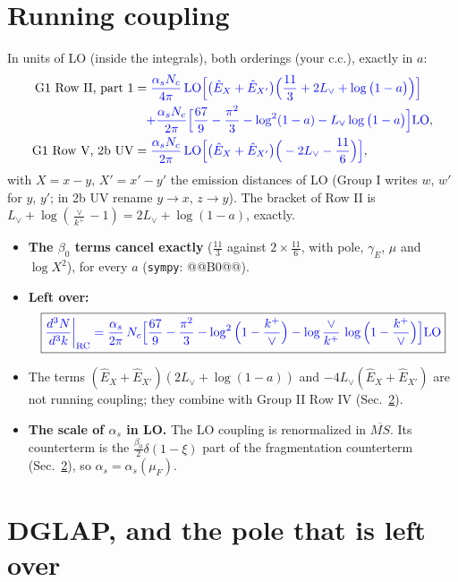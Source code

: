 \documentclass[10pt]{article}
\numberwithin{equation}{section}
\newcommand{\new}[1]{{\color{blue}#1}}
\newcommand{\Lv}{L_{\vee}}
\newcommand{\Eh}{\hat E}
\newcommand{\la}{\log\big(1-a\big)}
\begin{document}
\section{Running coupling}\label{sec:rc}
In units of LO (inside the integrals), both orderings (your c.c.), exactly in $a$:
\begin{align}
\text{G1 Row II, part 1}&=\new{\frac{\alpha_sN_c}{4\pi}\,{\rm LO}\Big[\big(\Eh_X+\Eh_{X'}\big)\Big(\frac{11}{3}+2\Lv+\la\Big)\Big]}\notag\\
&\quad\new{+\frac{\alpha_sN_c}{2\pi}\Big[\frac{67}{9}-\frac{\pi^2}{3}-\log^2(1-a)-\Lv\la\Big]{\rm LO}},\label{eq:rcII}\\
\text{G1 Row V, 2b UV}&=\new{\frac{\alpha_sN_c}{2\pi}\,{\rm LO}\Big[\big(\Eh_X+\Eh_{X'}\big)\Big(-2\Lv-\frac{11}{6}\Big)\Big]},\label{eq:rcV}
\end{align}
with $X=x-y$, $X'=x'-y'$ the emission distances of LO (Group I writes $w$, $w'$ for $y$, $y'$; in 2b UV rename $y\to x$, $z\to y$). The bracket of Row II is $\Lv+\log(\frac{\vee}{k^+}-1)=2\Lv+\log(1-a)$, exactly.
\begin{itemize}
\item \textbf{The $\beta_0$ terms cancel exactly} ($\frac{11}{3}$ against $2\times\frac{11}{6}$, with pole, $\gamma_E$, $\mu$ and $\log X^2$), for every $a$ (\texttt{sympy}: @@B0@@).
\item \textbf{Left over:}
\begin{equation}
\boxed{\new{\frac{d^3N}{d^3k}\bigg|_{\rm RC}=\frac{\alpha_s}{2\pi}\,N_c\Big[\frac{67}{9}-\frac{\pi^2}{3}-\log^2\Big(1-\frac{k^+}{\vee}\Big)-\log\frac{\vee}{k^+}\,\log\Big(1-\frac{k^+}{\vee}\Big)\Big]{\rm LO}}}
\label{eq:rc}
\end{equation}
\item The terms $(\Eh_X+\Eh_{X'})(2\Lv+\log(1-a))$ and $-4\Lv(\Eh_X+\Eh_{X'})$ are not running coupling; they combine with Group II Row IV (Sec.~\ref{sec:dglap}).
\item \textbf{The scale of $\alpha_s$ in LO.} The LO coupling is renormalized in $\overline{MS}$. Its counterterm is the $\frac{\beta_0}{2}\delta(1-\xi)$ part of the fragmentation counterterm (Sec.~\ref{sec:dglap}), so $\alpha_s=\alpha_s(\mu_F)$.
\end{itemize}

\section{DGLAP, and the pole that is left over}\label{sec:dglap}
\end{document}
